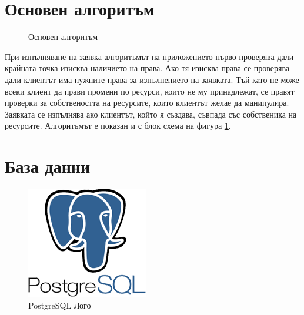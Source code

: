 \section{Основен алгоритъм}
\begin{figure}[h]
    \centering
    \caption{Основен алгоритъм}
    \label{fig:app_algorythm}
\end{figure}

При изпълняване на заявка алгоритъмът на приложението първо проверява дали крайната точка изисква наличието на права. Ако тя изисква права се проверява дали клиентът има нужните права за изпълнението на заявката. Тъй като не може всеки клиент да прави промени по ресурси, които не му принадлежат, се правят проверки за собствеността на ресурсите, които клиентът желае да манипулира. Заявката се изпълнява ако клиентът, който я създава, съвпада със собственика на ресурсите. Алгоритъмът е показан и с блок схема на фигура \ref{fig:app_algorythm}.

\section{База данни}
\begin{figure}[h]
    \centering
    \includegraphics{images/postgreSQL.png}
    \caption{PostgreSQL Лого}
    \label{fig:postgre_logo}
\end{figure}

